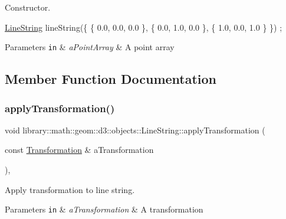 Constructor. 


\begin{DoxyCode}
\hyperlink{classlibrary_1_1math_1_1geom_1_1d3_1_1objects_1_1_line_string_aab80e60f34f06d4ab9f84f0e59aa389e}{LineString} lineString(\{ \{ 0.0, 0.0, 0.0 \}, \{ 0.0, 1.0, 0.0 \}, \{ 1.0, 0.0, 1.0 \} \}) ;
\end{DoxyCode}



\begin{DoxyParams}[1]{Parameters}
\mbox{\tt in}  & {\em a\+Point\+Array} & A point array \\
\hline
\end{DoxyParams}


\subsection{Member Function Documentation}
\mbox{\label{classlibrary_1_1math_1_1geom_1_1d3_1_1objects_1_1_line_string_a8a20f45b2af9cc45dbf7aff9e5d4824e}} 
\subsubsection{\texorpdfstring{apply\+Transformation()}{applyTransformation()}}
{\footnotesize\ttfamily void library\+::math\+::geom\+::d3\+::objects\+::\+Line\+String\+::apply\+Transformation (\begin{DoxyParamCaption}\item[{const \hyperlink{classlibrary_1_1math_1_1geom_1_1d3_1_1_transformation}{Transformation} \&}]{a\+Transformation }\end{DoxyParamCaption})\hspace{0.3cm}{\ttfamily [override]}, {\ttfamily [virtual]}}



Apply transformation to line string. 


\begin{DoxyParams}[1]{Parameters}
\mbox{\tt in}  & {\em a\+Transformation} & A transformation \\
\hline
\end{DoxyParams}


